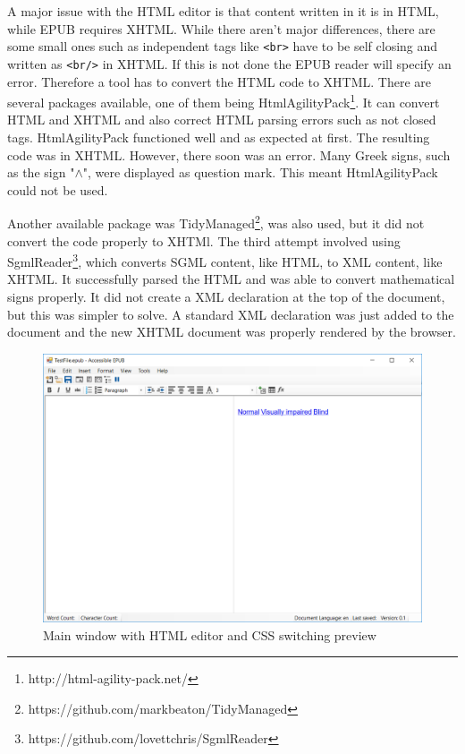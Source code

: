 A major issue with the HTML editor is that content written in it is in HTML, while EPUB requires XHTML. While there aren't major differences, there are some small ones such as independent tags like \lstinline|<br>| have to be self closing and written as \lstinline|<br/>| in XHTML. If this is not done the EPUB reader will specify an error. Therefore a tool has to convert the HTML code to XHTML. There are several packages available, one of them being HtmlAgilityPack\footnote{http://html-agility-pack.net/}. It can convert HTML and XHTML and also correct HTML parsing errors such as not closed tags. HtmlAgilityPack functioned well and as expected at first. The resulting code was in XHTML. However, there soon was an error. Many Greek signs, such as the sign "$\wedge$", were displayed as question mark. This meant HtmlAgilityPack could not be used. 

Another available package was TidyManaged\footnote{https://github.com/markbeaton/TidyManaged}, was also used, but it did not convert the code properly to XHTMl. The third attempt involved using SgmlReader\footnote{https://github.com/lovettchris/SgmlReader}, which converts SGML content, like HTML, to XML content, like XHTML. It successfully parsed the HTML and was able to convert mathematical signs properly. It did not create a XML declaration at the top of the document, but this was simpler to solve. A standard XML declaration was just added to the document and the new XHTML document was properly rendered by the browser.


\begin{figure}
	\begin{center}
		\includegraphics[width=\linewidth]{figures/formCss.png}	
		\caption{Main window with HTML editor and CSS switching preview}
		\label{fig:formCss}
	\end{center}
\end{figure}

